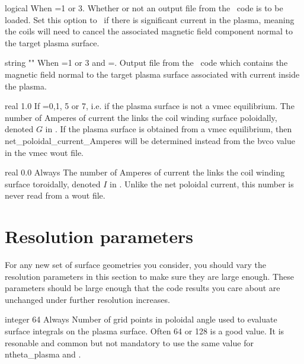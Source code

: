 \myhrule

{logical}
{\false}
{When =1 or 3.}
{Whether or not an output file from the \bnorm~code is to be loaded.
Set this option to \true~if there is significant current in the plasma,
meaning the coils will need to cancel the associated magnetic field component normal
to the target plasma surface.
}

\myhrule

{string}
{{\ttfamily ""}}
{When =1 or 3 and =\true.}
{Output file from the \bnorm~code which contains the magnetic field normal to the target
plasma surface associated with current inside the plasma.}

\myhrule

{real}
{1.0}
{If =0,1, 5 or 7, i.e. if the plasma surface is not a vmec equilibrium.}
{The number of Amperes of current the links the coil winding surface poloidally,
denoted $G$ in \cite{regcoilPaper}. If the plasma surface is obtained from a vmec equilibrium,
then {\ttfamily net\_poloidal\_current\_Amperes} will be determined instead
from the {\ttfamily bvco} value in the vmec wout file.
}

\myhrule

{real}
{0.0}
{Always}
{The number of Amperes of current the links the coil winding surface toroidally,
denoted $I$ in \cite{regcoilPaper}. Unlike the net poloidal current, this number
is never read from a wout file.
}



\section{Resolution parameters}

For any new set of surface geometries you consider, you should vary the resolution parameters in this section to make sure
they are large enough.  These parameters should be large enough that the code results you care about are unchanged under further
resolution increases.

\myhrule

{integer}
{64}
{Always}
{Number of grid points in poloidal angle used to evaluate surface integrals on the plasma surface.
Often 64 or 128 is a good value.
It is resonable and common but not mandatory to use the same value for {\ttfamily ntheta\_plasma} and .}

